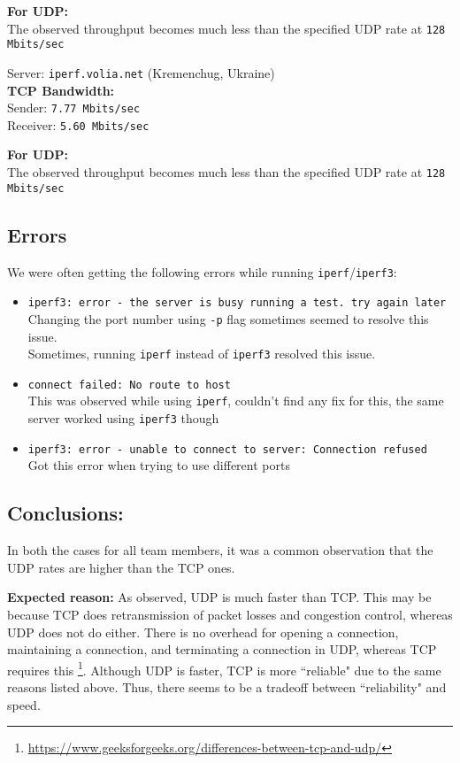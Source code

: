 \documentclass[11pt, fleqn]{article}
\begin{document}
\textbf{For UDP:}\\
The observed throughput becomes much less than the specified UDP rate at \texttt{128 Mbits/sec}

\hrulefill
\smallskip

Server: \texttt{iperf.volia.net} (Kremenchug, Ukraine)\\
\textbf{TCP Bandwidth:}\\
Sender: \texttt{7.77 Mbits/sec}\\
Receiver: \texttt{5.60 Mbits/sec}

\textbf{For UDP:}\\
The observed throughput becomes much less than the specified UDP rate at \texttt{128 Mbits/sec}

\hrulefill

\subsection*{Errors}

We were often getting the following errors while running \texttt{iperf}/\texttt{iperf3}:
\begin{itemize}[itemsep=-0.5ex]

    \item \texttt{iperf3: error - the server is busy running a test. try again later}\\
    Changing the port number using \texttt{-p} flag sometimes seemed to resolve this issue.\\
    Sometimes, running \texttt{iperf} instead of \texttt{iperf3} resolved this issue.
    
    \item \texttt{connect failed: No route to host}\\
    This was observed while using \texttt{iperf}, couldn't find any fix for this, the same server worked using \texttt{iperf3} though
    
    \item \texttt{iperf3: error - unable to connect to server: Connection refused}\\
    Got this error when trying to use different ports
    
\end{itemize}

\subsection*{Conclusions: }

In both the cases for all team members, it was a common observation that the UDP rates are higher than the TCP ones.

\textbf{Expected reason:} As observed, UDP is much faster than TCP. This may be because TCP does retransmission of packet losses and congestion control, whereas UDP does not do either. There is no overhead for opening a connection, maintaining a connection, and terminating a connection in UDP, whereas TCP requires this \footnote{\url{https://www.geeksforgeeks.org/differences-between-tcp-and-udp/}}. Although UDP is faster, TCP is more ``reliable" due to the same reasons listed above. Thus, there seems to be a tradeoff between ``reliability" and speed.
 
\end{document}
